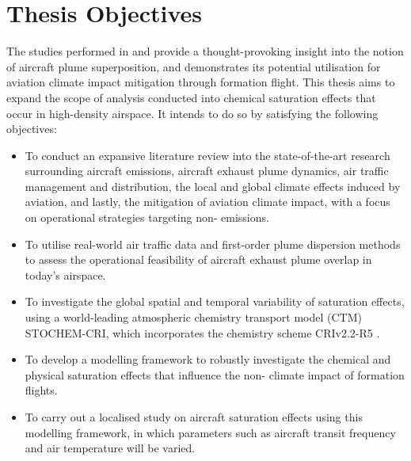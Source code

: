 \section{Thesis Objectives}
The studies performed in \cite{Cameron2013} and \cite{Schumann2015} provide a thought-provoking insight into the notion of aircraft plume superposition, and \cite{Dahlmann2020} demonstrates its potential utilisation for aviation climate impact mitigation through formation flight. This thesis aims to expand the scope of analysis conducted into chemical saturation effects that occur in high-density airspace. It intends to do so by satisfying the following objectives:
\begin{itemize}
    \item To conduct an expansive literature review into the state-of-the-art research surrounding aircraft emissions, aircraft exhaust plume dynamics, air traffic management and distribution, the local and global climate effects induced by aviation, and lastly, the mitigation of aviation climate impact, with a focus on operational strategies targeting non- emissions.
    \item To utilise real-world air traffic data and first-order plume dispersion methods to assess the operational feasibility of aircraft exhaust plume overlap in today's airspace.
    \item To investigate the global spatial and temporal variability of  saturation effects, using a world-leading atmospheric chemistry transport model (CTM) STOCHEM-CRI, which incorporates the chemistry scheme CRIv2.2-R5 \cite{Khan2021}.
    \item To develop a modelling framework to robustly investigate the chemical and physical saturation effects that influence the non- climate impact of formation flights.
    \item To carry out a localised study on aircraft  saturation effects using this modelling framework, in which parameters such as aircraft transit frequency and air temperature will be varied. 
\end{itemize}